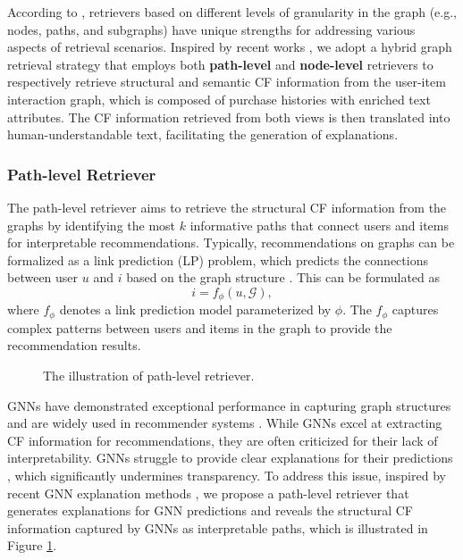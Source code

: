 According to \cite{peng2024graph}, retrievers based on different levels of granularity in the graph (e.g., nodes, paths, and subgraphs) have unique strengths for addressing various aspects of retrieval scenarios. Inspired by recent works \cite{luoreasoning,gao2024two}, we adopt a hybrid graph retrieval strategy that employs both \textbf{path-level} and \textbf{node-level} retrievers to respectively retrieve structural and semantic CF information from the user-item interaction graph, which is composed of purchase histories with enriched text attributes. The CF information retrieved from both views is then translated into human-understandable text, facilitating the generation of explanations.


\subsubsection{Path-level Retriever} The path-level retriever aims to retrieve the structural CF information from the graphs by identifying the most $k$ informative paths that connect users and items for interpretable recommendations. Typically, recommendations on graphs can be formalized as a link prediction (LP) problem, which predicts the connections between user $u$ and $i$ based on the graph structure \cite{li2013recommendation}. This can be formulated as 
\begin{equation}
    i = f_\phi(u, \mathcal{G}),
\end{equation}
where $f_\phi$ denotes a link prediction model parameterized by $\phi$. The $f_\phi$ captures complex patterns between users and items in the graph to provide the recommendation results.




\begin{figure}[t]
    \centering
    \vspace{-6mm}
    \caption{The illustration of path-level retriever.} 
    \label{fig:pathR}
    \vspace{-4mm}
\end{figure}



 GNNs \cite{wu2020comprehensive,DBLP:conf/icde/000200O024,wu2023billion,li2024gslb,li2024rethinking} have demonstrated exceptional performance in capturing graph structures and are widely used in recommender systems \cite{he2020lightgcn,wu2022graph}. While GNNs excel at extracting CF information for recommendations, they are often criticized for their lack of interpretability. GNNs struggle to provide clear explanations for their predictions \cite{ying2019gnnexplainer}, which significantly undermines transparency. To address this issue, inspired by recent GNN explanation methods \cite{zhang2023page}, we propose a path-level retriever that generates explanations for GNN predictions and reveals the structural CF information captured by GNNs as interpretable paths, which is illustrated in Figure \ref{fig:pathR}.

